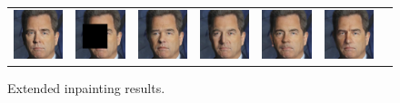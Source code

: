 \begin{figure}
\begin{center}
\begin{tabular}{ccccccc}
        \includegraphics[width=.145\textwidth]{Chapter2/samples/extended_results/inpainting/146/x.png} &   
        \includegraphics[width=.145\textwidth]{Chapter2/samples/extended_results/inpainting/146/y.png} &
        \includegraphics[width=.145\textwidth]{Chapter2/samples/extended_results/inpainting/146/CDE.png} & 
        \includegraphics[width=.145\textwidth]{Chapter2/samples/extended_results/inpainting/146/CDiffE.png} &
        \includegraphics[width=.145\textwidth]{Chapter2/samples/extended_results/inpainting/146/cmde.png} &
        \includegraphics[width=.145\textwidth]{Chapter2/samples/extended_results/inpainting/146/VS-CMDE.png}\\
        
        
    \end{tabular}
    \endgroup
    \end{center}
    \caption{Extended inpainting results.}
    \label{ch2:fig:additional_inpainting}
\end{figure}

